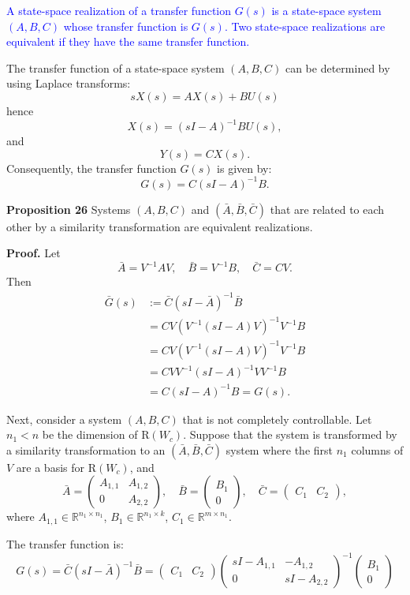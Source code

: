 \documentclass{article}
\begin{document}
\textcolor{blue}{
A state-space realization of a transfer function \( G(s) \) is a state-space system \((A, B, C)\) whose transfer function is \( G(s) \).
Two state-space realizations are equivalent if they have the same transfer function.
}

The transfer function of a state-space system \((A, B, C)\) can be determined by using Laplace transforms:
\[
sX(s) = AX(s) + BU(s)
\]
hence
\[
X(s) = (sI - A)^{-1}BU(s),
\]
and
\[
Y(s) = CX(s).
\]
Consequently, the transfer function \( G(s) \) is given by:
\[
G(s) = C(sI - A)^{-1}B.
\]

\textbf{Proposition 26}
Systems $(A, B, C)$ and $(\bar{A}, \bar{B}, \bar{C})$ that are related to each other by a similarity transformation are equivalent realizations.

\textbf{Proof.} Let
\[
\bar{A} = V^{-1}AV, \quad \bar{B} = V^{-1}B, \quad \bar{C} = CV.
\]
Then
\begin{align*}
\bar{G}(s) &:= \bar{C}(sI - \bar{A})^{-1}\bar{B} \\
&= CV (V^{-1}(sI - A)V)^{-1} V^{-1}B \\
&= CV (V^{-1}(sI - A)V)^{-1} V^{-1}B \\
&= CV V^{-1}(sI - A)^{-1} V V^{-1}B \\
&= C(sI - A)^{-1}B = G(s).
\end{align*}

Next, consider a system $(A, B, C)$ that is not completely controllable.
Let $n_1 < n$ be the dimension of $\text{R}(W_c)$. Suppose that the system is transformed by a similarity
transformation to an $(\bar{A}, \bar{B}, \bar{C})$ system where the first $n_1$ columns of $V$ are a basis for $\text{R}(W_c)$, and
\[
\bar{A} =
\begin{pmatrix}
A_{1,1} & A_{1,2} \\
0 & A_{2,2}
\end{pmatrix},
\quad
\bar{B} =
\begin{pmatrix}
B_1 \\
0
\end{pmatrix},
\quad
\bar{C} =
\begin{pmatrix}
C_1 & C_2
\end{pmatrix},
\]
where $A_{1,1} \in \mathbb{R}^{n_1 \times n_1}$, $B_1 \in \mathbb{R}^{n_1 \times k}$, $C_1 \in \mathbb{R}^{m \times n_1}$.

The transfer function is:
\[
G(s)
= \bar{C}(sI - \bar{A})^{-1}\bar{B}
= \begin{pmatrix}
C_1 & C_2
\end{pmatrix}
\begin{pmatrix}
sI - A_{1,1} & -A_{1,2} \\
0 & sI - A_{2,2}
\end{pmatrix}^{-1}
\begin{pmatrix}
B_1 \\
0
\end{pmatrix}
\]
\end{document}
